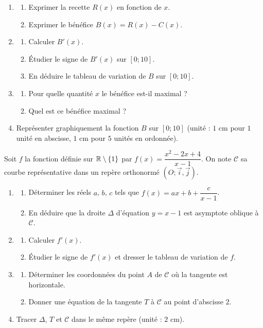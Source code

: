 \begin{enumerate}[label=\arabic*)]
\item 
\begin{enumerate}[label=\alph*)]
\item Exprimer la recette $R(x)$ en fonction de $x$.
\item Exprimer le bénéfice $B(x)=R(x)-C(x)$.
\end{enumerate}
\item 
\begin{enumerate}[label=\alph*)]
\item Calculer $B'(x)$.
\item Étudier le signe de $B'(x)$ sur $[0;10]$.
\item En déduire le tableau de variation de $B$ sur $[0;10]$.
\end{enumerate}
\item 
\begin{enumerate}[label=\alph*)]
\item Pour quelle quantité $x$ le bénéfice est-il maximal ?
\item Quel est ce bénéfice maximal ?
\end{enumerate}
\item Représenter graphiquement la fonction $B$ sur $[0;10]$ (unité : $1$ cm pour $1$ unité en abscisse, $1$ cm pour $5$ unités en ordonnée).
\end{enumerate}

Soit $f$ la fonction définie sur $\mathbb{R}\setminus\{1\}$ par $f(x)=\dfrac{x^2-2x+4}{x-1}$.
On note $\mathcal{C}$ sa courbe représentative dans un repère orthonormé $(O;\vec{i},\vec{j})$.

\begin{enumerate}[label=\arabic*)]
\item 
\begin{enumerate}[label=\alph*)]
\item Déterminer les réels $a$, $b$, $c$ tels que $f(x)=ax+b+\dfrac{c}{x-1}$.
\item En déduire que la droite $\Delta$ d'équation $y=x-1$ est asymptote oblique à $\mathcal{C}$.
\end{enumerate}
\item 
\begin{enumerate}[label=\alph*)]
\item Calculer $f'(x)$.
\item Étudier le signe de $f'(x)$ et dresser le tableau de variation de $f$.
\end{enumerate}
\item 
\begin{enumerate}[label=\alph*)]
\item Déterminer les coordonnées du point $A$ de $\mathcal{C}$ où la tangente est horizontale.
\item Donner une équation de la tangente $T$ à $\mathcal{C}$ au point d'abscisse $2$.
\end{enumerate}
\item Tracer $\Delta$, $T$ et $\mathcal{C}$ dans le même repère (unité : $2$ cm).
\end{enumerate}


